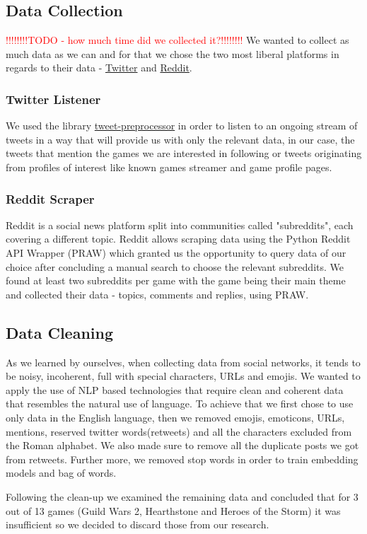 \subsection{Data Collection}
\textcolor{red}{!!!!!!!!TODO - how much time did we collected it?!!!!!!!!}
We wanted to collect as much data as we can and for that we chose the two most liberal platforms in regards to their data - \href{http://www.twitter.com}{Twitter} and \href{http://www.reddit.com}{Reddit}.

\subsubsection{Twitter Listener}
We used the library \href{https://pypi.org/project/tweet-preprocessor/}{tweet-preprocessor} in order to listen to an ongoing stream of tweets in a way that will provide us with only the relevant data, in our case, the tweets that mention the games we are interested in following or tweets originating from profiles of interest like known games streamer and game profile pages.

\subsubsection{Reddit Scraper}
Reddit is a social news platform split into communities called "subreddits", each covering a different topic.
Reddit allows scraping data using the Python Reddit API Wrapper (PRAW) which granted us the opportunity to query data of our choice after concluding a manual search to choose the relevant subreddits. 
We found at least two subreddits per game with the game being their main theme and collected their data - topics, comments and replies, using PRAW.

\subsection{Data Cleaning}
As we learned by ourselves, when collecting data from social networks, it tends to be noisy, incoherent, full with special characters, URLs and emojis.
We wanted to apply the use of NLP based technologies that require clean and coherent data that resembles the natural use of language. To achieve that we first chose to use only data in the English language, then we removed emojis, emoticons, URLs, mentions, reserved twitter words(retweets) and all the characters excluded from the Roman alphabet. We also made sure to remove all the duplicate posts we got from retweets. Further more, we removed stop words in order to train embedding models and bag of words. 

Following the clean-up we examined the remaining data and concluded that for 3 out of 13 games (Guild Wars 2, Hearthstone and Heroes of the Storm) it was insufficient so we decided to discard those from our research. 
